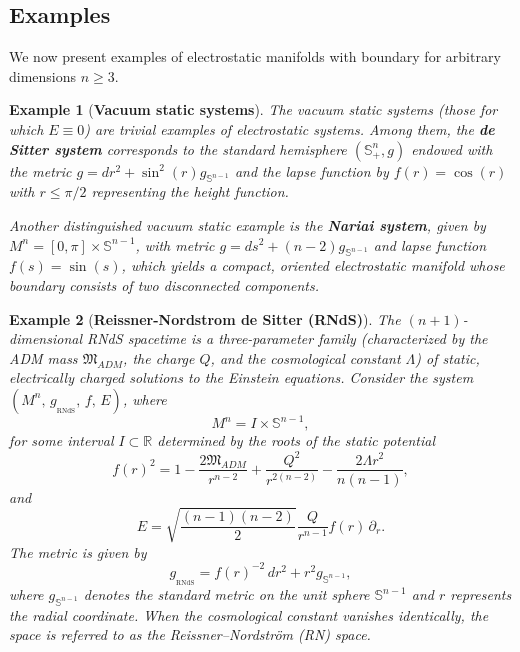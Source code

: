 \documentclass{amsart}
\newtheorem{example}{Example}
\numberwithin{equation}{section}
\begin{document}
	\subsection{Examples}
	\label{examples} We now present examples of electrostatic manifolds with boundary for arbitrary dimensions $n\geq 3.$
	
	
	\begin{example}[\textbf{Vacuum static systems}]
	\label{Exa1}
The vacuum static systems (those for which \( E \equiv 0 \)) are trivial examples of electrostatic systems. Among them, the {\bf de Sitter system} corresponds to the standard hemisphere \( (\mathbb{S}_{+}^{n}, g) \) endowed with the metric \( g = dr^{2} + \sin^{2}(r) g_{\mathbb{S}^{n-1}} \) and the lapse function by \( f(r) = \cos(r) \) with \( r \leq \pi/2 \) representing the height function. 

Another distinguished vacuum static example is the {\bf Nariai system}, given by \( M^{n} = [0, \pi] \times \mathbb{S}^{n-1} \), with metric \( g = ds^{2} + (n-2) g_{\mathbb{S}^{n-1}} \) and lapse function \( f(s) = \sin(s) \), which yields a compact, oriented electrostatic manifold whose boundary consists of two disconnected components.
\end{example}	

	
	
\begin{example}[\textbf{Reissner-Nordstrom de Sitter (RNdS)}]
The \((n+1)\)-dimensional RNdS spacetime is a three-parameter family (characterized by the ADM mass \(\mathfrak{M}_{ADM}\), the charge \(Q\), and the cosmological constant \(\Lambda\)) of static, electrically charged solutions to the Einstein equations. Consider the system \((M^n,\,g_{_{\mathrm{RNdS}}},\,f,\,E)\), where
\[
M^n = I \times \mathbb{S}^{n-1},
\]
for some interval \( I \subset \mathbb{R} \) determined by the roots of the static potential
\[
f(r)^2 = 1 - \frac{2\mathfrak{M}_{ADM}}{r^{n-2}} + \frac{Q^2}{r^{2(n-2)}} - \frac{2\Lambda r^2}{n(n-1)},
\]
and
\[
E = \sqrt{\frac{(n-1)(n-2)}{2}} \frac{Q}{r^{n-1}} f(r) \, \partial_r.
\]
The metric is given by
\[
g_{_{\mathrm{RNdS}}} = f(r)^{-2} \, dr^2 + r^2 g_{\mathbb{S}^{n-1}},
\]
where \( g_{\mathbb{S}^{n-1}} \) denotes the standard metric on the unit sphere \( \mathbb{S}^{n-1} \) and \( r \) represents the radial coordinate.  When the cosmological constant vanishes identically, the space is referred to as the {\it Reissner--Nordstr\"om} (RN) space.
\end{example}	
	
\end{document}

